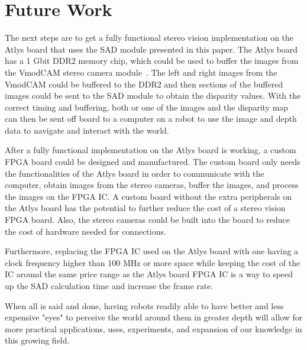 \chapter{Future Work}

The next steps are to get a fully functional stereo vision implementation on the Atlys board that uses the SAD module presented in this paper. The Atlys board has a 1 Gbit DDR2 memory chip, which could be used to buffer the images from the VmodCAM stereo camera module~\cite{atlysBoard}. The left and right images from the VmodCAM could be buffered to the DDR2 and then sections of the buffered images could be sent to the SAD module to obtain the disparity values. With the correct timing and buffering, both or one of the images and the disparity map can then be sent off board to a computer on a robot to use the image and depth data to navigate and interact with the world.

After a fully functional implementation on the Atlys board is working, a custom FPGA board could be designed and manufactured. The custom board only needs the functionalities of the Atlys board in order to communicate with the computer, obtain images from the stereo cameras, buffer the images, and process the images on the FPGA IC. A custom board without the extra peripherals on the Atlys board has the potential to further reduce the cost of a stereo vision FPGA board. Also, the stereo cameras could be built into the board to reduce the cost of hardware needed for connections.

Furthermore, replacing the FPGA IC used on the Atlys board with one having a clock frequency higher than 100 MHz or more space while keeping the cost of the IC around the same price range as the Atlys board FPGA IC is a way to speed up the SAD calculation time and increase the frame rate.

When all is said and done, having robots readily able to have better and less expensive "eyes" to perceive the world around them in greater depth will allow for more practical applications, uses, experiments, and expansion of our knowledge in this growing field.